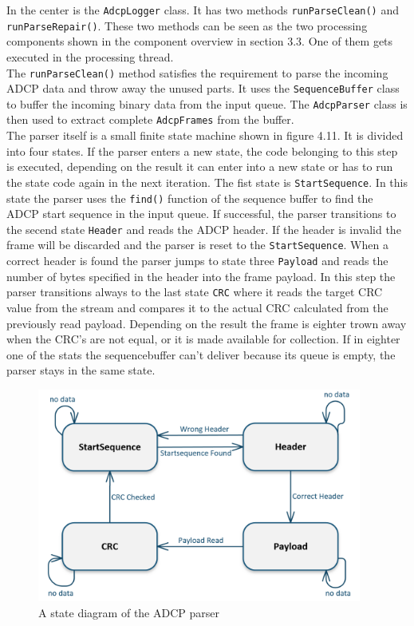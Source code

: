 In the center is the \texttt{AdcpLogger} class. It has two methods \texttt{runParseClean()} and \texttt{runParseRepair()}. These two methods can be seen as the two processing components shown in the component overview in section 3.3. One of them gets executed in the processing thread.\\
The \texttt{runParseClean()} method satisfies the requirement to parse the incoming ADCP data and throw away the unused parts. It uses the \texttt{SequenceBuffer} class to buffer the incoming binary data from the input queue. The \texttt{AdcpParser} class is then used to extract complete \texttt{AdcpFrames} from the buffer.\\
The parser itself is a small finite state machine shown in figure 4.11. It is divided into four states. If the parser enters a new state, the code belonging to this step is executed, depending on the result it can enter into a new state or has to run the state code again in the next iteration. The fist state is \texttt{StartSequence}. In this state the parser uses the \texttt{find()} function of the sequence buffer to find the ADCP start sequence in the input queue. If successful, the parser transitions to the secend state \texttt{Header} and reads the ADCP header. If the header is invalid the frame will be discarded and the parser is reset to the \texttt{StartSequence}. When a correct header is found the parser jumps to state three \texttt{Payload} and reads the number of bytes specified in the header into the frame payload. In this step the parser transitions always to the last state \texttt{CRC} where it reads the target CRC value from the stream and compares it to the actual CRC calculated from the previously read payload. Depending on the result the frame is eighter trown away when the CRC's are not equal, or it is made available for collection. If in eighter one of the stats the sequencebuffer can't deliver because its queue is empty, the parser stays in the same state.

\begin{figure}[h]
\centering
      \includegraphics[width=0.95\textwidth]{parser}
        \caption{A state diagram of the ADCP parser}
\end{figure}

